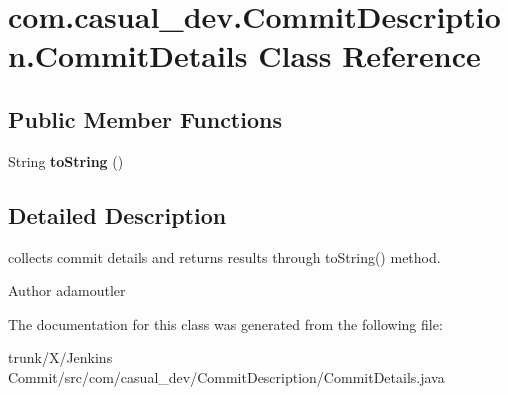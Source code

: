 \hypertarget{classcom_1_1casual__dev_1_1CommitDescription_1_1CommitDetails}{\section{com.\-casual\-\_\-dev.\-Commit\-Description.\-Commit\-Details Class Reference}
\label{classcom_1_1casual__dev_1_1CommitDescription_1_1CommitDetails}
}
\subsection*{Public Member Functions}
\begin{DoxyCompactItemize}
\item 
\hypertarget{classcom_1_1casual__dev_1_1CommitDescription_1_1CommitDetails_a114735e61da1ec4b4b16cca18af9e04e}{String {\bfseries to\-String} ()}\label{classcom_1_1casual__dev_1_1CommitDescription_1_1CommitDetails_a114735e61da1ec4b4b16cca18af9e04e}

\end{DoxyCompactItemize}


\subsection{Detailed Description}
collects commit details and returns results through to\-String() method.

\begin{DoxyAuthor}{Author}
adamoutler 
\end{DoxyAuthor}


The documentation for this class was generated from the following file\-:\begin{DoxyCompactItemize}
\item 
trunk/\-X/\-Jenkins Commit/src/com/casual\-\_\-dev/\-Commit\-Description/Commit\-Details.\-java\end{DoxyCompactItemize}
